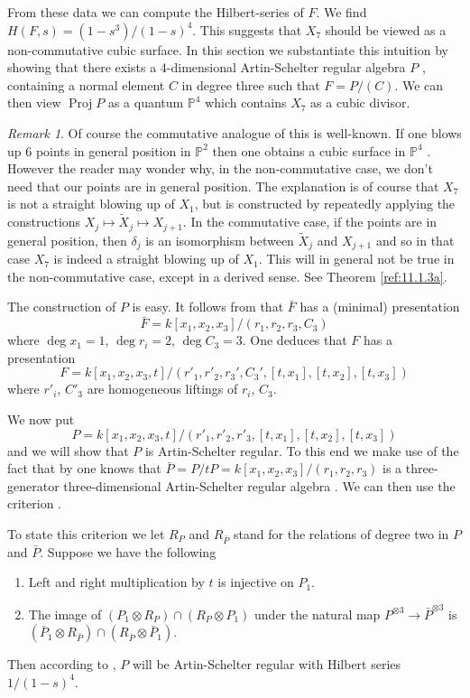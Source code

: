 \documentclass{amsproc}
\def \PP{{\mathbb P}}
\def\Proj{\operatorname {Proj}}
\def\r{\rightarrow}
\theoremstyle{definition}
\theoremstyle{remark}
\newtheorem{remarks}[lemmas]{Remark}
\numberwithin{equation}{section}
\numberwithin{table}{section}
\numberwithin{figure}{section}
\begin{document}
From these data we can compute the Hilbert-series of $F$. We find
$H(F,s)=(1-s^3)/(1-s)^4$. This suggests that $X_7$ should be viewed
as a non-commutative cubic surface. 
In this section we substantiate this
intuition by showing that there exists a  4-dimensional
Artin-Schelter regular algebra $P$ \cite{AS}, containing a normal
element $C$ in degree three such that $F=P/(C)$.  We can then view
$\Proj P$ as a quantum $\PP^4$ which contains $X_7$ as a cubic divisor.




\begin{remarks} Of course the commutative analogue of this is
  well-known. If one blows up 6 points in general position in $\PP^2$
  then one obtains a cubic surface in $\PP^4$ \cite{H}. However the
  reader may wonder why, in the non-commutative case, we don't need
  that our points are in general position. The explanation is of
  course that $X_7$ is not a straight blowing up of $X_1$, but is
  constructed by repeatedly applying the constructions $X_{j}\mapsto
  \tilde{X}_{{j}}\mapsto X_{{j}+1}$.  In the commutative case, if the points
  are in general position, then $\delta_{j}$ is an isomorphism between
  $\tilde{X}_{j}$ and $X_{{j}+1}$ and so in that case $X_7$ is indeed a straight
  blowing up of $X_1$. This will in general not be true in the
  non-commutative case, except in a derived sense. See Theorem
  \ref{ref:11.1.3a}.
\end{remarks}



The construction of $P$ is easy. It follows from \cite{ATV1}
that $\bar{F}$ has a (minimal) presentation
\[
\bar{F}=k[x_1,x_2,x_3]/(r_1,r_2,r_3,C_3)
\]
where $\deg x_1=1$, $\deg r_i=2$, $\deg C_3=3$.  One deduces that 
 $F$ has a presentation
\[
F=k[x_1,x_2,x_3,t]/(r'_1,r'_2,r_3',C_3',[t,x_1],[t,x_2],[t,x_3])
\]
where   $r'_i$, $C'_3$ are homogeneous liftings of $r_i$, $C_3$. 

We now put
\[
P=k[x_1,x_2,x_3,t]/(r'_1,r'_2,r'_3,[t,x_1],[t,x_2],[t,x_3]) 
\]
and we will show that $P$ is Artin-Schelter regular. To this end we
make use of the fact that by \cite{ATV1} one knows that
$\bar{P}=P/tP=k[x_1,x_2,x_3]/(r_1,r_2,r_3)$ is a three-generator
three-dimensional Artin-Schelter regular algebra \cite{AS}. We can then use
the criterion \cite[Cor. 2.7]{LSV}.

To state this criterion we let $R_P$ and  $R_{\bar{P}}$ stand for the
relations of degree two in $P$ and $\bar{P}$. Suppose we have the
following
\begin{enumerate}
\item Left and right multiplication by $t$ is injective on $P_1$.
\item The image of $(P_1\otimes R_P)\cap (R_P\otimes P_1)$ under the
  natural map $P^{\otimes 3}\r \bar{P}^{\otimes 3}$ is   
$(\bar{P}_1\otimes R_{\bar{P}})\cap (R_{\bar{P}}\otimes \bar{P}_1)$.
\end{enumerate}
Then according to \cite[Cor. 2.7]{LSV}, $P$ will be Artin-Schelter
regular with Hilbert series $1/(1-s)^4$.
\end{document}
